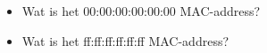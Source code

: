 \begin{itemize}
	\item Wat is het 00:00:00:00:00:00 MAC-address?
	\item Wat is het ff:ff:ff:ff:ff:ff MAC-address?
\end{itemize}
